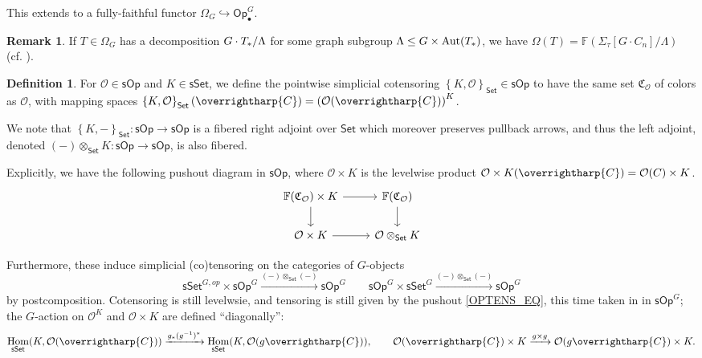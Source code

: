 \documentclass[a4paper,10pt
,draft
]{article}%
\numberwithin{equation}{section}
\numberwithin{figure}{section}
\theoremstyle{definition} %
\newtheorem{definition}[equation]{Definition}%
\newtheorem{remark}[equation]{Remark}%
\newcommand{\set}[1]{\left\{#1\right\}}%
\newcommand{\into}{\hookrightarrow}%
\newcommand{\vect}[1]{\text{\overrightharp{\ensuremath{#1}}}}
\newcommand{\Set}{\ensuremath{\mathsf{Set}}}
\newcommand{\sSet}{\ensuremath{\mathsf{sSet}}}%
\newcommand{\Op}{\mathsf{Op}}%
\newcommand{\sOp}{\ensuremath{\mathsf{sOp}}}%
\DeclareMathOperator{\Hom}{Hom}%
\DeclareMathOperator{\Aut}{Aut}%
\renewcommand{\O}{\ensuremath{\mathcal O}}
\newcommand{\1}{\ensuremath{\mathbbm 1}}%
\begin{document}
This extends to a fully-faithful functor $\Omega_G \into \Op_\bullet^G$.

\begin{remark}
      If $T \in \Omega_G$ has a decomposition $G \cdot T_{\**}/\Lambda$ for some graph subgroup $\Lambda \leq G \times \Aut(T_{\**})$,
we have $\Omega(T) = \mathbb{F} \left( \Sigma_{\tau}[G \cdot C_n]/\Lambda \right)$ (cf. \cite[\S 2.3]{BP_HGOP}).
\end{remark}



\begin{definition}
      \label{COTENS_DEF}
      For $\O \in \sOp$ and $K \in \sSet$, we define the pointwise simplicial cotensoring
      \( \set{K,\O}_\Set \in \sOp \) to have the same set $\mathfrak C_\O$ of colors as $\O$, with mapping spaces
      \( \set{K, \O}_\Set (\vect C) = \left( \O(\vect C) \right)^K \). 

      We note that $\set{K,-}_\Set \colon \sOp \to \sOp$ is a fibered right adjoint over $\Set$ which moreover preserves pullback arrows,
      and thus the left adjoint, denoted $(-) \otimes_\Set K \colon \sOp \to \sOp$, is also fibered.
\end{definition}
Explicitly, we have the following pushout diagram in $\sOp$, where $\O \times K$ is the levelwise product $\O \times K(\vect C) = \O(C) \times K$.
\begin{equation}
      \label{OPTENS_EQ}
      \begin{tikzcd}
            \mathbb F(\mathfrak C_\O) \times K \arrow[d] \arrow[r]
            &
            \mathbb F(\mathfrak C_\O) \arrow[d]
            \\
            \O \times K \arrow[r]
            &
            \O \otimes_\Set K
      \end{tikzcd}
\end{equation}

Furthermore, these induce simplicial (co)tensoring on the categories of $G$-objects 
\[
      \sSet^{G,op} \times \sOp^G \xrightarrow{(-) \otimes_\Set (-)} \sOp^G
      \qquad
      \sOp^G \times \sSet^G \xrightarrow{(-) \otimes_\Set (-)} \sOp^G
\]
by postcomposition.
Cotensoring is still levelwsie, and tensoring is still given by the pushout \eqref{OPTENS_EQ}, this time taken in in $\sOp^G$;
the $G$-action on $\O^K$ and $\O \times K$ are defined ``diagonally'':
\[
      \Hom_{\sSet}(K,\O(\vect C)) \xrightarrow{g_{\**}(g^{-1})^{\**}} \Hom_{\sSet}(K, \O(g \vect C)),
      \qquad
      \O(\vect C) \times K \xrightarrow{g \times g} \O(g \vect C) \times K.
\]
\end{document}
